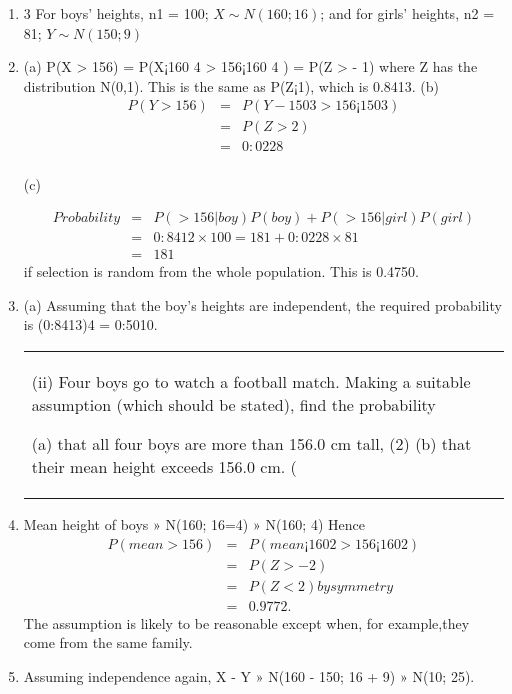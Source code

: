 \documentclass[a4paper,12pt]{article}
\begin{document}
\begin{enumerate}
 \item 3 For boys’ heights, n1 = 100; $X \sim N(160; 16)$; and for girls’ heights, n2 = 81; $Y \sim N(150; 9)$
\item (a) P(X > 156) = P(X¡160
4 > 156¡160
4 ) = P(Z > - 1) where Z has the distribution
N(0,1). This is the same as P(Z¡1), which is 0.8413.
(b) 
\begin{eqnarray*}
  P(Y > 156) &=& P(Y - 150
3 > 156¡150
3 ) \\ &=& P(Z > 2)\\ &=& 0:0228  \\
\end{eqnarray*}

(c)

\begin{eqnarray*}
Probability&=&P(> 156|boy)P(boy) + P(> 156|girl)P(girl)\\ &=& 0:8412 \times 100=181 +
0:0228 \times 81 \\&=&181
\end{eqnarray*} if selection is random from the whole population. This is 0.4750.
\item (a) Assuming that the boy’s heights are independent, the required probability is (0:8413)4
= 0:5010.

  \begin{table}[ht!]
  \centering
  \begin{tabular}{|p{15cm}|}
  \hline
 (ii) Four boys go to watch a football match.  Making a suitable assumption (which should be stated), find the probability 
 
  (a) that all four boys are more than 156.0 cm tall,   (2)   (b) that their mean height exceeds 156.0 cm.    (
  \hline
    \end{tabular}
 \end{table}
\item Mean height of boys » N(160; 16=4) » N(160; 4)
Hence 
\begin{eqnarray*}
P(mean > 156) &=& P(mean¡160
2 > 156¡160
2 ) \\ &=& P(Z > - 2) \\ &=& P(Z < 2) by
symmetry\\ &=& 0.9772.
\end{eqnarray*}
The assumption is likely to be reasonable except when, for example,they come from
the same family.
\item Assuming independence again, X -  Y » N(160 -  150; 16 + 9) » N(10; 25).


\end{enumerate}
\end{document}
